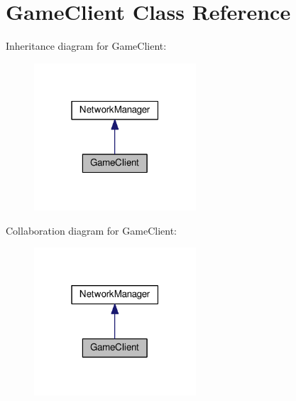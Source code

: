 \hypertarget{classGameClient}{}\section{Game\+Client Class Reference}
\label{classGameClient}


Inheritance diagram for Game\+Client\+:
\nopagebreak
\begin{figure}[H]
\begin{center}
\leavevmode
\includegraphics[width=171pt]{classGameClient__inherit__graph}
\end{center}
\end{figure}


Collaboration diagram for Game\+Client\+:
\nopagebreak
\begin{figure}[H]
\begin{center}
\leavevmode
\includegraphics[width=171pt]{classGameClient__coll__graph}
\end{center}
\end{figure}
